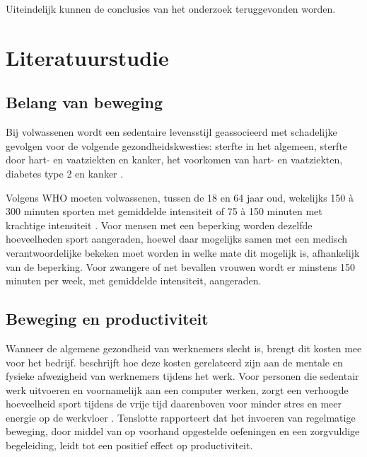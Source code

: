 Uiteindelijk kunnen de conclusies van het onderzoek teruggevonden worden.





\section{Literatuurstudie}%
\label{sec:state-of-the-art}

\subsection{Belang van beweging}
Bij volwassenen wordt een sedentaire levensstijl geassocieerd met schadelijke gevolgen voor de volgende gezondheidskwesties: sterfte in het algemeen, sterfte door hart- en vaatziekten en kanker, het voorkomen van hart- en vaatziekten, diabetes type 2 en kanker \autocite{Bull2020}.

Volgens WHO moeten volwassenen, tussen de 18 en 64 jaar oud, wekelijks 150 à 300 minuten sporten met gemiddelde intensiteit of 75 à 150 minuten met krachtige intensiteit \autocite{Bull2020}. Voor mensen met een beperking worden dezelfde hoeveelheden sport aangeraden, hoewel daar mogelijks samen met een medisch verantwoordelijke bekeken moet worden in welke mate dit mogelijk is, afhankelijk van de beperking. Voor zwangere of net bevallen vrouwen wordt er minstens 150 minuten per week, met gemiddelde intensiteit, aangeraden.

\subsection{Beweging en productiviteit}

Wanneer de algemene gezondheid van werknemers slecht is, brengt dit kosten mee voor het bedrijf. \textcite{Sjoegaard2016} beschrijft hoe deze kosten gerelateerd zijn aan de mentale en fysieke afwezigheid van werknemers tijdens het werk. Voor personen die sedentair werk uitvoeren en voornamelijk aan een computer werken, zorgt een verhoogde hoeveelheid sport tijdens de vrije tijd daarenboven voor minder stres en meer energie op de werkvloer \autocite{Hansen2009}. Tenslotte rapporteert \textcite{Cancelliere2011} dat het invoeren van regelmatige beweging, door middel van op voorhand opgestelde oefeningen en een zorgvuldige begeleiding, leidt tot een positief effect op productiviteit.

